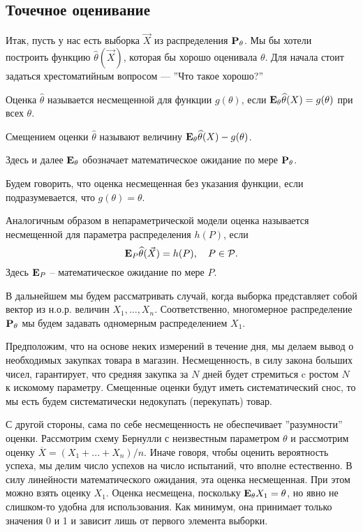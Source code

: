 \documentclass[10 pt,russian]{report}
\begin{document}
\subsection{Точечное оценивание}
Итак, пусть у нас есть выборка $\vec{X}$ из распределения ${\bf P}_{\theta}$. Мы бы хотели построить функцию $\widehat{\theta}(\vec{X})$, которая бы хорошо оценивала $\theta$. Для начала стоит задаться хрестоматийным вопросом --- ''Что такое хорошо?''
\begin{Def}
Оценка $\widehat{\theta}$ называется несмещенной для функции $g(\theta)$, если ${\bf E}_{\theta} \widehat{\theta}(X) = g(\theta)$ при всех $\theta$.
\end{Def}
\begin{Def}
Смещением оценки $\widehat{\theta}$ называют величину ${\bf E}_{\theta}\widehat{\theta}(X)-g(\theta)$. 
\end{Def}
Здесь и далее ${\bf E}_{\theta}$ обозначает математическое ожидание по мере ${\bf P}_{\theta}$. 

Будем говорить, что оценка несмещенная без указания функции, если подразумевается, что $g(\theta)=\theta$.

Аналогичным образом в непараметрической модели оценка называется несмещенной для параметра распределения $h(P)$, если
$${\bf E}_{P} \widehat{\theta}(\vec{X}) = h(P), \quad P\in \mathcal{P}.$$
Здесь ${\bf E}_P$ -- математическое ожидание по мере $P$.

В дальнейшем мы будем рассматривать случай, когда выборка представляет собой вектор из н.о.р. величин $X_1,\dotsc, X_n$. Соответственно, многомерное распределение ${\bf P}_{\theta}$ мы будем задавать одномерным распределением $X_1$.

\Exam Предположим, что на основе неких измерений в течение дня, мы делаем вывод о необходимых закупках товара в магазин. Несмещенность, в силу закона больших чисел, гарантирует, что средняя закупка за $N$ дней будет стремиться c  ростом $N$ к искомому параметру. Смещенные оценки будут иметь систематический снос, то мы есть будем систематически недокупать (перекупать) товар. 

С другой стороны, сама по себе несмещенность не обеспечивает ''разумности'' оценки.
\Exam Рассмотрим схему Бернулли с неизвестным параметром $\theta$ и рассмотрим оценку $\overline{X} = (X_1+...+X_n)/n$. Иначе говоря, чтобы оценить вероятность успеха, мы делим число успехов на число испытаний, что вполне естественно. В силу линейности математического ожидания, эта оценка несмещенная. При этом можно взять оценку $X_1$. Оценка несмещена, поскольку ${\bf E}_{\theta} X_1 = \theta$, но явно не слишком-то удобна для использования. Как минимум, она принимает только значения 0 и 1 и зависит лишь от первого элемента выборки.
\end{document}
